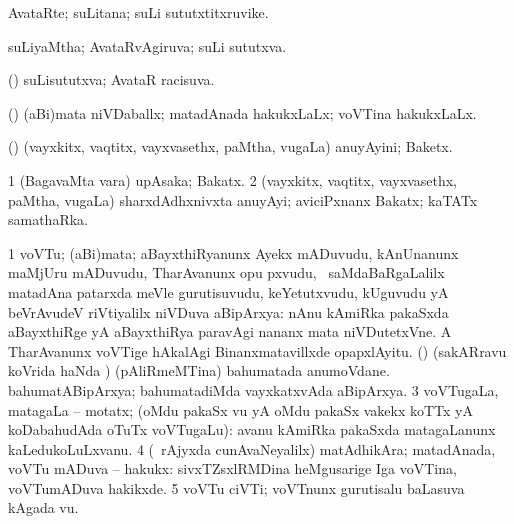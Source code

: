 {{{{{{{{{{{{{{\bentry 
{} 
\gl{\nA}
\expl{}
\bmng
 AvataRte; suLitana; suLi sututxtitxruvike. 
\emng
\eentry

\bentry 
{} 
\gl{\gu}
\expl{}
\bmng
\emng
\eentry

\bentry 
{} 
\gl{\gu}
\expl{}
\bmng
 suLiyaMtha; AvataRvAgiruva; suLi sututxva. 
\emng
\eentry

\bentry
{} 
\gl{\gu}
\expl{}
\bmng
 (\pArxparx) suLisututxva; AvataR racisuva. 
\emng
\eentry

\bentry 
{} 
\gl{\gu}
\expl{}
\bmng
 (\viparx) (aBi)mata niVDaballx; matadAnada hakukxLaLx; voVTina hakukxLaLx. 
\emng
\eentry

\bentry
{} 
\gl{\nA}
\expl{}
\bmng
 (\sitxrXV) (vayxkitx, vaqtitx, vayxvasethx, paMtha, \mo vugaLa) anuyAyini; Baketx. 
\emng
\eentry

\bentry 
{} 
\gl{\nA}
\expl{}
\bmng
\emng
\eentry

\bentry 
{} 
\gl{\nA}
\bmng
\bnum
\num{1} (BagavaMta \mo vara) upAsaka; Bakatx. 
\hypertarget{votary(2)}{} 
\num{2} (vayxkitx, vaqtitx, vayxvasethx, paMtha, \mo vugaLa) sharxdAdhxnivxta anuyAyi; aviciPxnanx Bakatx; kaTATx samathaRka. 
\enum
\emng
\eentry

\bentry
{} 
\gl{\nA}
\expl{}
\bmng
\bnum
\num{1} voVTu; (aBi)mata; aBayxthiRyanunx Ayekx mADuvudu, kAnUnanunx maMjUru mADuvudu, TharAvanunx opu pxvudu, \mo\ saMdaBaRgaLalilx matadAna patarxda meVle gurutisuvudu, keYetutxvudu, kUguvudu yA beVrAvudeV riVtiyalilx niVDuva aBipArxya:  nAnu kAmiRka pakaSxda aBayxthiRge yA aBayxthiRya paravAgi nananx mata niVDutetxVne.  A TharAvanunx voVTige hAkalAgi Binanxmatavillxde opapxlAyitu. 
 (\birx) 
\banum
{} (sakARravu koVrida haNda \vi) (pAliRmeMTina) bahumatada anumoVdane. 
 bahumatABipArxya; bahumatadiMda vayxkatxvAda aBipArxya. 
\eanum
\numie
\num{3} voVTugaLa, matagaLa -- motatx; (oMdu pakaSx \mo vu yA oMdu pakaSx \mo vakekx koTTx yA koDabahudAda oTuTx voVTugaLu):  avanu kAmiRka pakaSxda matagaLanunx kaLedukoLuLxvanu. 
\num{4} (\kanmu\ rAjyxda cunAvaNeyalilx) matAdhikAra; matadAnada, voVTu mADuva -- hakukx:  sivxTZsxlRMDina heMgusarige Iga voVTina, voVTumADuva hakikxde. 
\num{5} voVTu ciVTi; voVTnunx gurutisalu baLasuva kAgada \mo vu. 
\enum
\emng

}}}}}}}}}}}}}}
